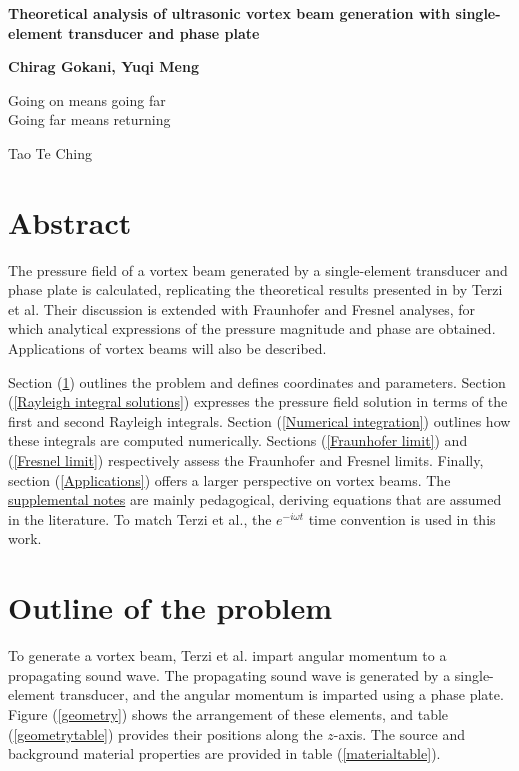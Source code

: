 \documentclass[12pt]{article}%
\begin{document}
\begin{center}
\begin{large}
\textbf{Theoretical analysis of ultrasonic vortex beam generation with single-element transducer and phase plate}\\ %
\end{large}
\textbf{Chirag Gokani, Yuqi Meng}
\end{center}
{
\epigraph{Going on means going far\\ Going far means returning}{Tao Te Ching}
}


\section*{Abstract} %

The pressure field of a vortex beam generated by a single-element transducer and phase plate is calculated, replicating the theoretical results presented in \cite{ref1} by Terzi et al. Their discussion is extended with Fraunhofer and Fresnel analyses, for which analytical expressions of the pressure magnitude and phase are obtained. Applications of vortex beams will also be described. %

Section (\ref{Problem}) outlines the problem and defines coordinates and parameters. Section (\ref{Rayleigh integral solutions}) expresses the pressure field solution in terms of the first and second Rayleigh integrals. Section (\ref{Numerical integration}) outlines how these integrals are computed numerically. Sections (\ref{Fraunhofer limit}) and (\ref{Fresnel limit}) respectively assess the Fraunhofer and Fresnel limits. Finally, section (\ref{Applications}) offers a larger perspective on vortex beams. The \href{https://github.com/cag170030/Ultrasonics_2022}{supplemental notes} are mainly pedagogical,  deriving equations that are assumed in the literature. To match Terzi et al., the $e^{-i\omega t}$ time convention is used in this work. %


\section{Outline of the problem}\label{Problem}

To generate a vortex beam, Terzi et al.  impart angular momentum to a propagating sound wave. The propagating sound wave is generated by a \color{magenta}single-element transducer\color{black}, and the angular momentum is imparted using a \color{blue}phase plate\color{black}. Figure (\ref{geometry}) shows the arrangement of these elements, and table (\ref{geometrytable}) provides their positions along the $z$-axis. The source and background material properties are provided in table (\ref{materialtable}). 
\end{document}
